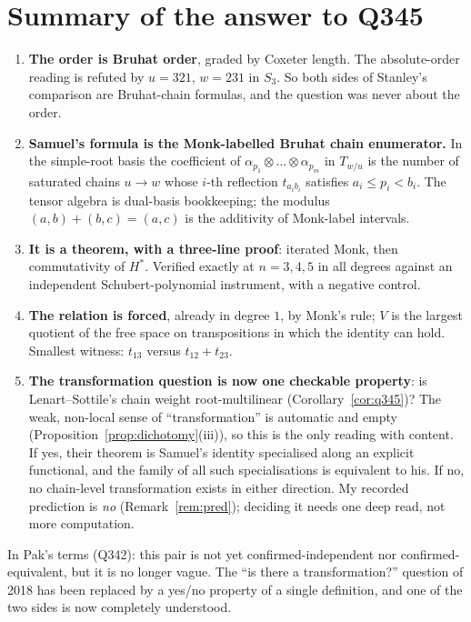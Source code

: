 \documentclass[11pt]{article}
\theoremstyle{plain}
\theoremstyle{definition}
\begin{document}
\section{Summary of the answer to Q345}

\begin{enumerate}
\item \textbf{The order is Bruhat order}, graded by Coxeter length. The
absolute-order reading is refuted by $u=321$, $w=231$ in $S_{3}$. So both sides
of Stanley's comparison are Bruhat-chain formulas, and the question was never
about the order.
\item \textbf{Samuel's formula is the Monk-labelled Bruhat chain enumerator.}
In the simple-root basis the coefficient of
$\alpha_{p_{1}}\otimes\dots\otimes\alpha_{p_{m}}$ in $T_{w/u}$ is the number of
saturated chains $u\to w$ whose $i$-th reflection $t_{a_{i}b_{i}}$ satisfies
$a_{i}\le p_{i}<b_{i}$. The tensor algebra is dual-basis bookkeeping; the
modulus $(a,b)+(b,c)=(a,c)$ is the additivity of Monk-label intervals.
\item \textbf{It is a theorem, with a three-line proof}: iterated Monk, then
commutativity of $H^{*}$. Verified exactly at $n=3,4,5$ in all degrees against
an independent Schubert-polynomial instrument, with a negative control.
\item \textbf{The relation is forced}, already in degree $1$, by Monk's rule;
$V$ is the largest quotient of the free space on transpositions in which the
identity can hold. Smallest witness: $t_{13}$ versus $t_{12}+t_{23}$.
\item \textbf{The transformation question is now one checkable property}:
is Lenart--Sottile's chain weight root-multilinear
(Corollary~\ref{cor:q345})? The weak, non-local sense of ``transformation'' is
automatic and empty (Proposition~\ref{prop:dichotomy}(iii)), so this is the
only reading with content. If yes, their theorem is Samuel's identity
specialised along an explicit functional, and the family of all such
specialisations is equivalent to his. If no, no chain-level transformation
exists in either direction. My recorded prediction is \emph{no}
(Remark~\ref{rem:pred}); deciding it needs one deep read, not more
computation.
\end{enumerate}

\noindent In Pak's terms (Q342): this pair is not yet confirmed-independent nor
confirmed-equivalent, but it is no longer vague. The ``is there a
transformation?'' question of 2018 has been replaced by a yes/no property of a
single definition, and one of the two sides is now completely understood.
\end{document}
